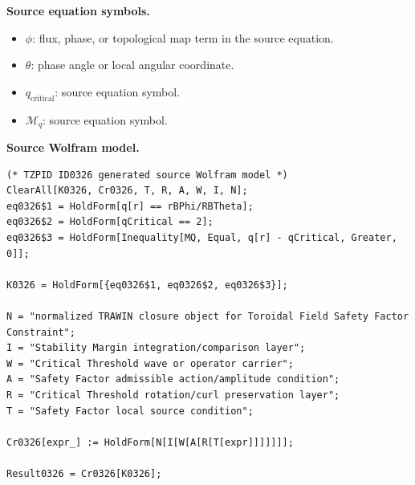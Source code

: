 \begin{minipage}[t]{0.49\linewidth}
\begingroup
\small
\raggedright
\textbf{Source equation symbols.}\par
\begin{itemize}[leftmargin=1.35em,itemsep=1pt,topsep=1pt,parsep=0pt]
    \item $\phi$: flux, phase, or topological map term in the source equation.
    \item $\theta$: phase angle or local angular coordinate.
    \item $q_{\mathrm{critical}}$: source equation symbol.
    \item $\mathcal{M}_{q}$: source equation symbol.
\end{itemize}
\endgroup
\end{minipage}\hfill
\begin{minipage}[t]{0.47\linewidth}
\begingroup
\scriptsize
\raggedright
\textbf{Source Wolfram model.}\par
\begin{Verbatim}[fontsize=\tiny,breaklines=true,breakanywhere=true]
(* TZPID ID0326 generated source Wolfram model *)
ClearAll[K0326, Cr0326, T, R, A, W, I, N];
eq0326$1 = HoldForm[q[r] == rBPhi/RBTheta];
eq0326$2 = HoldForm[qCritical == 2];
eq0326$3 = HoldForm[Inequality[MQ, Equal, q[r] - qCritical, Greater, 0]];

K0326 = HoldForm[{eq0326$1, eq0326$2, eq0326$3}];

N = "normalized TRAWIN closure object for Toroidal Field Safety Factor Constraint";
I = "Stability Margin integration/comparison layer";
W = "Critical Threshold wave or operator carrier";
A = "Safety Factor admissible action/amplitude condition";
R = "Critical Threshold rotation/curl preservation layer";
T = "Safety Factor local source condition";

Cr0326[expr_] := HoldForm[N[I[W[A[R[T[expr]]]]]]];

Result0326 = Cr0326[K0326];
\end{Verbatim}
\endgroup
\end{minipage}

